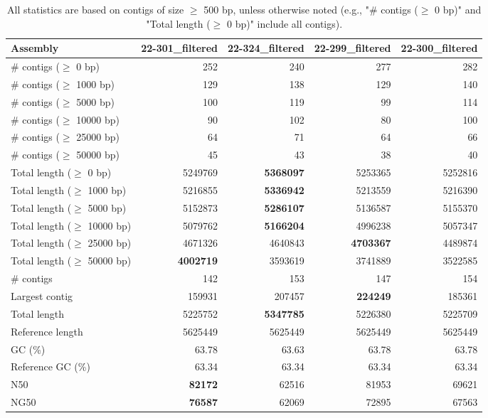 \documentclass[12pt,a4paper]{article}
\begin{document}
\begin{table}[ht]
\begin{center}
\caption{All statistics are based on contigs of size $\geq$ 500 bp, unless otherwise noted (e.g., "\# contigs ($\geq$ 0 bp)" and "Total length ($\geq$ 0 bp)" include all contigs).}
\begin{tabular}{|l*{4}{|r}|}
\hline
Assembly & 22-301\_filtered & 22-324\_filtered & 22-299\_filtered & 22-300\_filtered \\ \hline
\# contigs ($\geq$ 0 bp) & 252 & 240 & 277 & 282 \\ \hline
\# contigs ($\geq$ 1000 bp) & 129 & 138 & 129 & 140 \\ \hline
\# contigs ($\geq$ 5000 bp) & 100 & 119 & 99 & 114 \\ \hline
\# contigs ($\geq$ 10000 bp) & 90 & 102 & 80 & 100 \\ \hline
\# contigs ($\geq$ 25000 bp) & 64 & 71 & 64 & 66 \\ \hline
\# contigs ($\geq$ 50000 bp) & 45 & 43 & 38 & 40 \\ \hline
Total length ($\geq$ 0 bp) & 5249769 & {\bf 5368097} & 5253365 & 5252816 \\ \hline
Total length ($\geq$ 1000 bp) & 5216855 & {\bf 5336942} & 5213559 & 5216390 \\ \hline
Total length ($\geq$ 5000 bp) & 5152873 & {\bf 5286107} & 5136587 & 5155370 \\ \hline
Total length ($\geq$ 10000 bp) & 5079762 & {\bf 5166204} & 4996238 & 5057347 \\ \hline
Total length ($\geq$ 25000 bp) & 4671326 & 4640843 & {\bf 4703367} & 4489874 \\ \hline
Total length ($\geq$ 50000 bp) & {\bf 4002719} & 3593619 & 3741889 & 3522585 \\ \hline
\# contigs & 142 & 153 & 147 & 154 \\ \hline
Largest contig & 159931 & 207457 & {\bf 224249} & 185361 \\ \hline
Total length & 5225752 & {\bf 5347785} & 5226380 & 5225709 \\ \hline
Reference length & 5625449 & 5625449 & 5625449 & 5625449 \\ \hline
GC (\%) & 63.78 & 63.63 & 63.78 & 63.78 \\ \hline
Reference GC (\%) & 63.34 & 63.34 & 63.34 & 63.34 \\ \hline
N50 & {\bf 82172} & 62516 & 81953 & 69621 \\ \hline
NG50 & {\bf 76587} & 62069 & 72895 & 67563 \\ \hline

\end{tabular}
\end{center}
\end{table}
\end{document}
